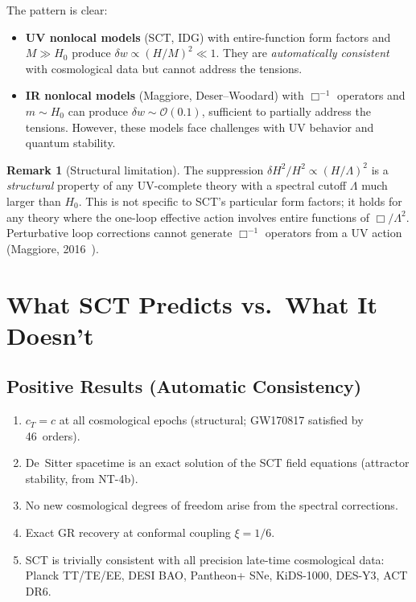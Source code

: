 \documentclass[11pt,a4paper]{article}
\newcommand{\Lam}{\Lambda}
\theoremstyle{plain}
\theoremstyle{definition}
\newtheorem{remark}[theorem]{Remark}
\begin{document}
The pattern is clear:
\begin{itemize}[nosep]
  \item \textbf{UV nonlocal models} (SCT, IDG) with entire-function
    form factors and $M \gg H_0$ produce $\delta w \propto (H/M)^2
    \ll 1$. They are \emph{automatically consistent} with cosmological
    data but cannot address the tensions.
  \item \textbf{IR nonlocal models} (Maggiore, Deser--Woodard) with
    $\Box^{-1}$ operators and $m \sim H_0$ can produce $\delta w \sim
    \mathcal{O}(0.1)$, sufficient to partially address the tensions.
    However, these models face challenges with UV behavior and quantum
    stability.
\end{itemize}

\begin{remark}[Structural limitation]
The suppression $\delta H^2/H^2 \propto (H/\Lam)^2$ is a
\emph{structural} property of any UV-complete theory with a spectral
cutoff $\Lam$ much larger than $H_0$. This is not specific to SCT's
particular form factors; it holds for any theory where the one-loop
effective action involves entire functions of $\Box/\Lam^2$. Perturbative
loop corrections cannot generate $\Box^{-1}$ operators from a UV action
(Maggiore, 2016~\cite{Maggiore16}).
\end{remark}

\section{What SCT Predicts vs.\ What It Doesn't}\label{sec:predictions}

\subsection{Positive Results (Automatic Consistency)}

\begin{enumerate}[nosep]
  \item $c_T = c$ at all cosmological epochs (structural; GW170817
    satisfied by 46~orders).
  \item De~Sitter spacetime is an exact solution of the SCT field
    equations (attractor stability, from NT-4b).
  \item No new cosmological degrees of freedom arise from the spectral
    corrections.
  \item Exact GR recovery at conformal coupling $\xi = 1/6$.
  \item SCT is trivially consistent with all precision late-time
    cosmological data: Planck TT/TE/EE, DESI BAO, Pantheon+ SNe,
    KiDS-1000, DES-Y3, ACT DR6.
\end{enumerate}
\end{document}
